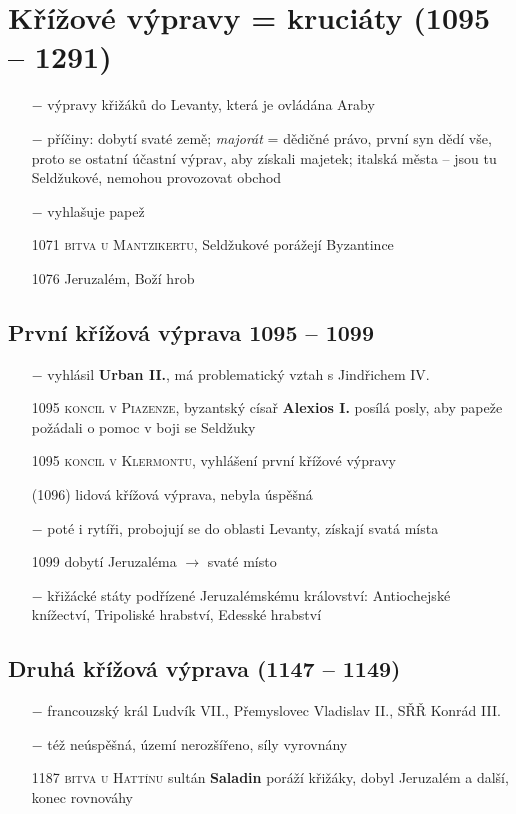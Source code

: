 \documentclass{article}
\begin{document}
\section*{Křížové výpravy = kruciáty (1095 -- 1291)}
\begin{itemize}
    \vspace{-0.5em}
    \setlength\itemsep{0.15em}
    \item[$-$] výpravy křižáků do Levanty, která je ovládána Araby
    \item[$-$] příčiny: dobytí svaté země; \textit{majorát} = dědičné právo, první syn dědí vše, proto se ostatní účastní výprav, aby získali majetek; italská města -- jsou tu Seldžukové, nemohou provozovat obchod
    \item[$-$] vyhlašuje papež
    \item[1071] \textsc{bitva u Mantzikertu}, Seldžukové porážejí Byzantince
    \item[1076] Jeruzalém, Boží hrob
\end{itemize}

\subsection*{První křížová výprava 1095 -- 1099}
\begin{itemize}
    \vspace{-0.5em}
    \setlength\itemsep{0.15em}
    \item[$-$] vyhlásil \textbf{Urban II.}, má problematický vztah s Jindřichem IV.
    \item[1095] \textsc{koncil v Piazenze}, byzantský císař \textbf{Alexios I.} posílá posly, aby papeže požádali o pomoc v boji se Seldžuky
    \item[1095] \textsc{koncil v Klermontu}, vyhlášení první křížové výpravy
    \item[(1096)] lidová křížová výprava, nebyla úspěšná
    \item[$-$] poté i rytíři, probojují se do oblasti Levanty, získají svatá místa
    \item[1099] dobytí Jeruzaléma $\rightarrow$ svaté místo
    \item[$-$] křižácké státy podřízené Jeruzalémskému království: Antiochejské knížectví, Tripoliské hrabství, Edesské hrabství
\end{itemize}

\subsection*{Druhá křížová výprava (1147 -- 1149)}
\begin{itemize}
    \vspace{-0.5em}
    \setlength\itemsep{0.15em}
    \item[$-$] francouzský král Ludvík VII., Přemyslovec Vladislav II., SŘŘ Konrád III.
    \item[$-$] též neúspěšná, území nerozšířeno, síly vyrovnány
    \item[1187] \textsc{bitva u Hattínu} sultán \textbf{Saladin} poráží křižáky, dobyl Jeruzalém a další, konec rovnováhy
\end{itemize}
\end{document}
